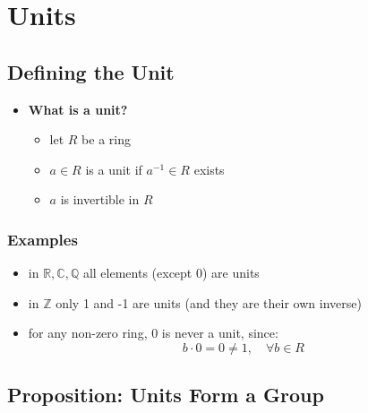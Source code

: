 \documentclass{exam}
\begin{document}

\section{Units}

\subsection{Defining the Unit}

\begin{itemize}
    \item \textbf{What is a unit?}
    \begin{itemize}
        \item let $R$ be a ring
        \item $a \in R$ is a unit if $a^{-1} \in R$ exists
        \item $a$ is invertible in $R$
    \end{itemize}
\end{itemize}

\subsubsection{Examples}

\begin{itemize}
    \item in $\mathbb{R}, \mathbb{C}, \mathbb{Q}$ all elements (except 0) are units
    \item in $\mathbb{Z}$ only 1 and -1 are units (and they are their own inverse)
    \item for any non-zero ring, 0 is never a unit, since:
    \[
    b \cdot 0 = 0 \neq 1, \quad \forall b \in R
    \]
\end{itemize}

\subsection{Proposition: Units Form a Group}
\end{document}
